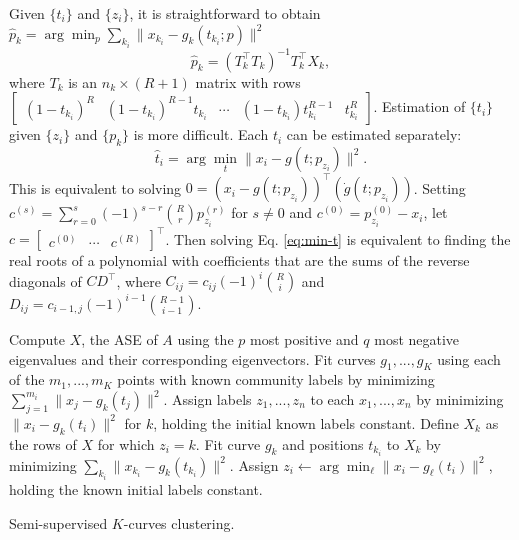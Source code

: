 \documentclass[12pt]{article}
\begin{document}
Given \(\{t_i\}\) and \(\{z_i\}\), it is straightforward to obtain
\(\hat{p}_k = \arg\min_p \sum_{k_i} \|x_{k_i} - g_k (t_{k_i}; p)\|^2\)
\[\hat{p}_k = (T_k^\top T_k)^{-1} T_k^\top X_k,\] where \(T_k\) is an
\(n_k \times (R+1)\) matrix with rows
\(\begin{bmatrix} (1 - t_{k_i})^R & (1 - t_{k_i})^{R-1} t_{k_i} & \cdots & (1 - t_{k_i}) t_{k_i}^{R-1} & t_{k_i}^R \end{bmatrix}\).
Estimation of \(\{t_i\}\) given \(\{z_i\}\) and \(\{p_k\}\) is more
difficult. Each \(t_i\) can be estimated separately:
\begin{equation} \label{eq:min-t}
\hat{t}_i = \arg\min_t \|x_i - g(t; p_{z_i})\|^2. 
\end{equation} This is equivalent to solving
\(0 = (x_i - g(t; p_{z_i}))^\top (\dot{g}(t; p_{z_i}))\). Setting
\(c^{(s)} = \sum_{r=0}^s (-1)^{s-r} \binom{R}{r} p^{(r)}_{z_i}\) for
\(s \neq 0\) and \(c^{(0)} = p^{(0)}_{z_i} - x_i\), let
\(c = \begin{bmatrix} c^{(0)} & \cdots & c^{(R)} \end{bmatrix}^\top\).
Then solving Eq. \ref{eq:min-t} is equivalent to finding the real roots
of a polynomial with coefficients that are the sums of the reverse
diagonals of \(C D^\top\), where \(C_{ij} = c_{ij} (-1)^i \binom{R}{i}\)
and \(D_{ij} = c_{i-1,j} (-1)^{i-1} \binom{R-1}{i-1}\).

\begin{algorithm}[H]
\DontPrintSemicolon
\SetAlgoLined
{}
Compute $X$, the ASE of $A$ using the $p$ most positive and $q$ most negative eigenvalues and their corresponding eigenvectors.\;
Fit curves $g_1, ..., g_K$ using each of the $m_1, ..., m_K$ points with known community labels by minimizing $\sum_{j=1}^{m_i} \|x_j - g_k(t_j)\|^2$.\;
Assign labels $z_1, ..., z_n$ to each $x_1, ..., x_n$ by minimizing $\|x_i - g_k(t_i)\|^2$ for $k$, holding the initial known labels constant.\; 
 {
 {
Define $X_k$ as the rows of $X$ for which $z_i = k$.\;
Fit curve $g_k$ and positions $t_{k_i}$ to $X_k$ by minimizing $\sum_{k_i} \|x_{k_i} - g_k(t_{k_i})\|^2$.\;
}
 {
Assign $z_i \leftarrow \arg\min_\ell \|x_i - g_\ell(t_i)\|^2$, holding the known initial labels constant.\
}
}
\caption{Semi-supervised $K$-curves clustering.}
\end{algorithm}
\end{document}
